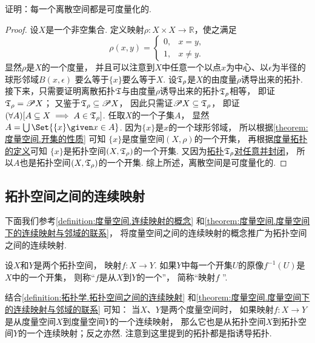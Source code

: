 \begin{example}
证明：每一个离散空间都是可度量化的.
\begin{proof}
设\(X\)是一个非空集合.
定义映射\(\rho\colon X \times X \to \mathbb{R}\)，使之满足\begin{equation*}
	\rho(x,y) = \left\{ \begin{array}{cl}
		0, & x = y, \\
		1, & x \neq y.
	\end{array} \right.
\end{equation*}
显然\(\rho\)是\(X\)的一个度量，
并且可以注意到\(X\)中任意一个以点\(x\)为中心、以\(\epsilon\)为半径的球形邻域\(B(x,\epsilon)\)
要么等于\(\{x\}\)要么等于\(X\).
设\({\mathfrak T}_\rho\)是\(X\)的由度量\(\rho\)诱导出来的拓扑.
接下来，只需要证明离散拓扑\({\mathfrak T}\)与由度量\(\rho\)诱导出来的拓扑\({\mathfrak T}_\rho\)相等，
即证\({\mathfrak T}_\rho = \mathscr{P} X\)；
又鉴于\({\mathfrak T}_\rho \subseteq \mathscr{P} X\)，
因此只需证\(\mathscr{P} X \subseteq {\mathfrak T}_\rho\)，
即证\(
	(\forall A)
	[
		A \subseteq X
		\implies
		A \in {\mathfrak T}_\rho
	]
\).
任取\(X\)的一个子集\(A\)，
显然\(A = \bigcup\Set{ \{x\} \given x \in A }\).
因为\(\{x\}\)是\(x\)的一个球形邻域，
所以根据\cref{theorem:度量空间.开集的性质} 可知
\(\{x\}\)是度量空间\((X,\rho)\)的一个开集，
再根据\hyperref[definition:拓扑空间.度量拓扑]{度量拓扑的定义}可知
\(\{x\}\)是拓扑空间\((X,{\mathfrak T}_\rho)\)的一个开集.
又因为\hyperref[definition:拓扑学.开集公理定义的拓扑空间]{拓扑\({\mathfrak T}_\rho\)对任意并封闭}，
所以\(A\)也是拓扑空间\((X,{\mathfrak T}_\rho)\)的一个开集.
综上所述，离散空间是可度量化的.
\end{proof}
\end{example}

\subsection{拓扑空间之间的连续映射}
下面我们参考\cref{definition:度量空间.连续映射的概念}
和\cref{theorem:度量空间.度量空间下的连续映射与邻域的联系}，
将度量空间之间的连续映射的概念推广为拓扑空间之间的连续映射.

\begin{definition}\label{definition:拓扑学.拓扑空间之间的连续映射}
设\(X\)和\(Y\)是两个拓扑空间，
映射\(f\colon X \to Y\).
如果\(Y\)中每一个开集\(U\)的原像\(f^{-1}(U)\)是\(X\)中的一个开集，
则称“\(f\)是从\(X\)到\(Y\)的一个”，
简称“映射\(f\) ”.
\end{definition}
结合\cref{definition:拓扑学.拓扑空间之间的连续映射}
和\cref{theorem:度量空间.度量空间下的连续映射与邻域的联系} 可知：
当\(X\)、\(Y\)是两个度量空间时，
如果映射\(f\colon X \to Y\)是从度量空间\(X\)到度量空间\(Y\)的一个连续映射，
那么它也是从拓扑空间\(X\)到拓扑空间\(Y\)的一个连续映射；反之亦然.
注意到这里提到的拓扑都是指诱导拓扑.

